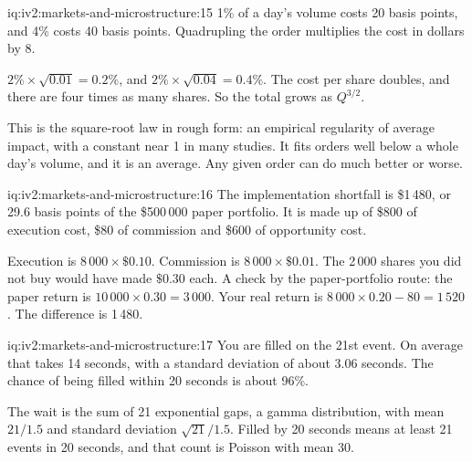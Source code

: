 \begin{solution}{iq:iv2:markets-and-microstructure:15}
1\% of a day's volume costs 20 basis points, and 4\% costs 40 basis points. Quadrupling the order multiplies the cost in dollars by 8.

$2\% \times \sqrt{0.01} = 0.2\%$, and $2\% \times \sqrt{0.04} = 0.4\%$. The cost per share doubles, and there are four times as many shares. So the total grows as $Q^{3/2}$.

This is the square-root law in rough form: an empirical regularity of average impact, with a constant near 1 in many studies. It fits orders well below a whole day's volume, and it is an average. Any given order can do much better or worse.

\end{solution}

\begin{solution}{iq:iv2:markets-and-microstructure:16}
The implementation shortfall is \$1\,480, or 29.6 basis points of the \$500\,000 paper portfolio. It is made up of \$800 of execution cost, \$80 of commission and \$600 of opportunity cost.

Execution is $8\,000 \times \$0.10$. Commission is $8\,000 \times \$0.01$. The 2\,000 shares you did not buy would have made $\$0.30$ each. A check by the paper-portfolio route: the paper return is $10\,000 \times 0.30 = 3\,000$. Your real return is $8\,000 \times 0.20 - 80 = 1\,520$. The difference is 1\,480.

\end{solution}

\begin{solution}{iq:iv2:markets-and-microstructure:17}
You are filled on the 21st event. On average that takes 14 seconds, with a standard deviation of about 3.06 seconds. The chance of being filled within 20 seconds is about 96\%.

The wait is the sum of 21 exponential gaps, a gamma distribution, with mean $21/1.5$ and standard deviation $\sqrt{21}/1.5$. Filled by 20 seconds means at least 21 events in 20 seconds, and that count is Poisson with mean 30.

\end{solution}

